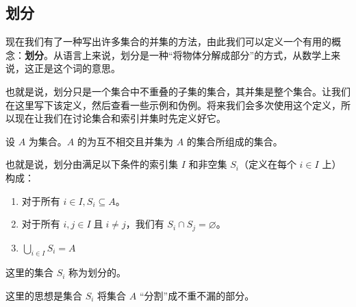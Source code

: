 \subsection{划分}

现在我们有了一种写出许多集合的并集的方法，由此我们可以定义一个有用的概念：\textbf{划分}。从语言上来说，划分是一种``将物体分解成部分''的方式，从数学上来说，这正是这个词的意思。

也就是说，划分只是一个集合中不重叠的子集的集合，其并集是整个集合。让我们在这里写下该定义，然后查看一些示例和伪例。将来我们会多次使用这个定义，所以现在让我们在讨论集合和索引并集时先定义好它。

\begin{definition}\label{def:definition3.6.9}
    设 $A$ 为集合。$A$ 的为互不相交且并集为 $A$ 的集合所组成的集合。

    也就是说，划分由满足以下条件的索引集 $I$ 和非空集 $S_i$（定义在每个 $i \in I$ 上）构成：
    \begin{enumerate}[label=(\arabic*)]
        \item 对于所有 $i \in I, S_i \subseteq A$。
        \item 对于所有 $i, j \in I \;\text{且}\; i \ne j$，我们有 $S_i \cap S_j = \varnothing$。
        \item $\displaystyle \bigcup_{i \in I} S_i = A$
    \end{enumerate}
    这里的集合 $S_i$ 称为划分的。
\end{definition}

这里的思想是集合 $S_i$ 将集合 $A$ ``分割''成不重不漏的部分。\\

